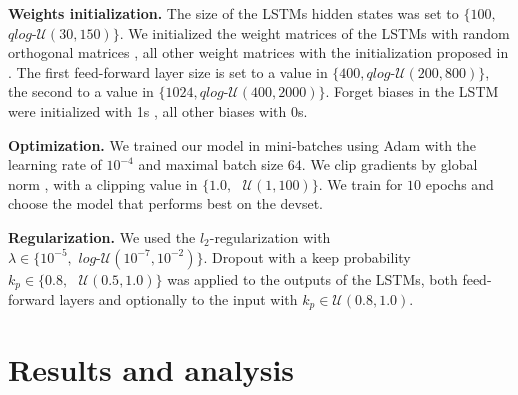 \documentclass[11pt,letterpaper]{article}
\begin{document}
\textbf{Weights initialization.} The size of the LSTMs hidden states was set to $\{100,$ $\textit{qlog-}\mathcal{U}(30,150) \}$. We initialized the weight matrices of the LSTMs with random orthogonal matrices \cite{Henaff2016RecurrentON}, all other weight matrices with the initialization proposed in \citet{He2015DelvingDI}. The first feed-forward layer size is set to a value in $\{400, \textit{qlog-}\mathcal{U}(200,800)\}$, the second to a value in $\{1024, \textit{qlog-}\mathcal{U}(400,2000)\}$. Forget biases in the LSTM were initialized with 1s \cite{Jzefowicz2015AnEE}, all other biases with 0s.

\textbf{Optimization.} We trained our model in mini-batches using Adam
\cite{kingma2014adam} with 
the learning rate of $10^{-4}$
and maximal batch size
$64$.
We clip gradients by global norm \cite{Pascanu2013OnTD}, with 
a 
clipping value in $\{1.0, \text{ }\mathcal{U}(1,100)\}$. We train 
for $10$ epochs and choose the model 
that performs best on
the devset. 

\textbf{Regularization.} We used the 
$l_2$-regularization with $\lambda \in \{10^{-5}, \textit{ log-}\mathcal{U}(10^{-7},10^{-2})\}$. Drop\-out \cite{Srivastava2014DropoutAS} with a 
keep pro\-ba\-bi\-li\-ty  $k_p\in\{0.8, \text{ } \mathcal{U}(0.5,1.0)\}$ was applied to the outputs of the LSTMs, both feed-forward layers
and optionally to the input with $k_p \in \mathcal{U}(0.8,1.0)$.


 	
\section{Results and analysis}
\end{document}
